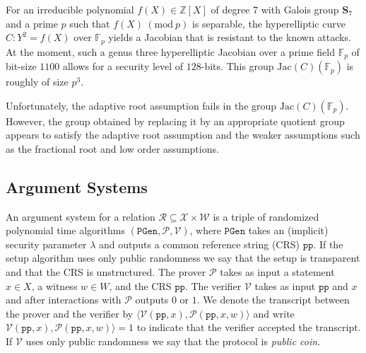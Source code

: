 \documentclass[11pt, lettersize, notitlepage, leqno, footskip=0.6cm]{article}
\newcommand{\bz}{\mathbb Z}
\newcommand{\bFp}{\mathbb{F}_p}
\newcommand{\ttt}{\texttt}
\newcommand{\mc}{\mathcal}
\newcommand{\mbf}{\mathbf}
\newcommand{\mr}{\mathrm}
\newcommand{\Jac}{\mr{Jac}}
\newcommand{\lam}{\lambda}
\newcommand{\sub}{\subseteq}
\newcommand{\mP}{\mc{P}}
\newcommand{\V}{\mc{V}}
\newcommand{\Mod}[1]{\ (\mathrm{mod}\ #1)}
\numberwithin{equation}{section}
\begin{document}
For an irreducible polynomial $f(X)\in \bz[X]$ of degree $7$ with Galois group $\mbf{S}_7$ and a prime $p$ such that $f(X)\Mod{p}$ is separable, the hyperelliptic curve $C:Y^2 = f(X)$ over $\bFp$ yields a Jacobian that is resistant to the known attacks. At the moment, such a genus three hyperelliptic Jacobian over a prime field $\bFp$ of bit-size $1100$ allows for a security level of $128$-bits. This group $\Jac(C)(\bFp)$ is roughly of size $p^3$.

Unfortunately, the adaptive root assumption fails in the group $\Jac(C)(\bFp)$. However, the group obtained by replacing it by an appropriate quotient group appears to satisfy the adaptive root assumption and the weaker assumptions such as the fractional root and low order assumptions. 

\subsection{\fontsize{11}{11}\selectfont Argument Systems }


An argument system for a relation $\mc{R}\sub \mc{X} \times \mc{W}$ is a triple of randomized polynomial time algorithms $(\ttt{PGen}, \mP, \V)$, where $\ttt{PGen}$ takes an (implicit) security parameter $\lam$ and outputs a common reference string (CRS) $\ttt{pp}$. If the setup algorithm uses only public randomness we say that the setup is transparent and that the CRS is unstructured. The prover $\mP$ takes as input a statement $x \in X$, a witness $w \in W$, and the CRS $\ttt{pp}$. The verifier $\V$ takes as input $\ttt{pp}$ and $x$ and after interactions with $\mP$ outputs $0$ or $1$. We denote the transcript between the prover and the verifier by $\langle\V(\ttt{pp}, x),\mP(\ttt{pp}, x, w)\rangle$ and write $\V(\ttt{pp}, x), \mP(\ttt{pp}, x, w)\rangle = 1$ to indicate that the verifier accepted the transcript. If $\V$ uses only public randomness we say that the protocol is \textit{public coin}.
\end{document}
